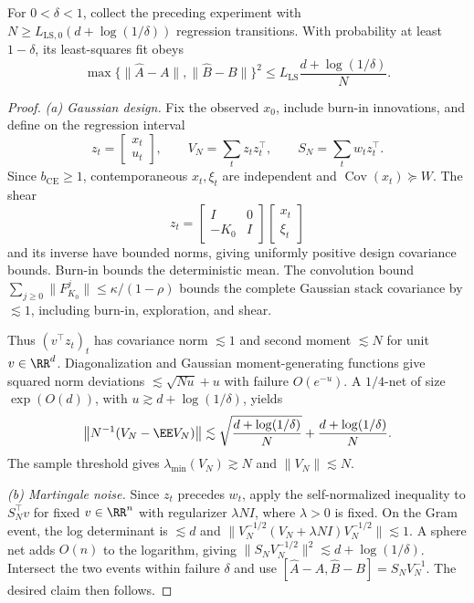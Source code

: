 \begin{lemma}\label{app:lem:ls}
For $0<\delta<1$, collect the preceding experiment with
$N\ge L_{\mathrm{LS},0}(d+\log(1/\delta))$ regression transitions.
With probability at least $1-\delta$, its least-squares fit obeys
\[
 \max\{\|\widehat A-A\|,\|\widehat B-B\|\}^2
 \le L_{\mathrm{LS}}\frac{d+\log(1/\delta)}N .
\]
\end{lemma}
\begin{proof}
\emph{(a) Gaussian design.}
Fix the observed $x_0$, include burn-in innovations, and define
on the regression interval
\[
 z_t=\begin{bmatrix}x_t\\u_t\end{bmatrix},\qquad
 V_N=\sum_tz_tz_t^\top,\qquad
 S_N=\sum_tw_tz_t^\top .
\]
Since $b_{\mathrm{CE}}\ge1$, contemporaneous $x_t,\xi_t$ are
independent and $\operatorname{Cov}(x_t)\succeq W$. The shear
\[
 z_t=\begin{bmatrix}I&0\\-K_0&I\end{bmatrix}
       \begin{bmatrix}x_t\\\xi_t\end{bmatrix}
\]
and its inverse have bounded norms, giving uniformly positive
design covariance bounds. Burn-in bounds the deterministic mean.
The convolution bound
$\sum_{j\ge0}\|F_{K_0}^j\|\le\kappa/(1-\rho)$ bounds the complete
Gaussian stack covariance by $\lesssim1$, including burn-in,
exploration, and shear.

Thus $(v^\top z_t)_t$ has covariance norm $\lesssim1$ and second
moment $\lesssim N$ for unit $v\in\RR^d$.
Diagonalization and Gaussian moment-generating functions give squared
norm deviations $\lesssim\sqrt{Nu}+u$ with failure $O(e^{-u})$.
A $1/4$-net of size $\exp(O(d))$, with
$u\gtrsim d+\log(1/\delta)$, yields
\[
 \left\|N^{-1}(V_N-\EE V_N)\right\|
 \lesssim\sqrt{\frac{d+\log(1/\delta)}N}
              +\frac{d+\log(1/\delta)}N .
\]
The sample threshold gives
$\lambda_{\min}(V_N)\gtrsim N$ and $\|V_N\|\lesssim N$.

\emph{(b) Martingale noise.}
Since $z_t$ precedes $w_t$, apply the self-normalized inequality
\citep{abbasi2011improved} to $S_N^\top v$ for fixed $v\in\RR^n$
with regularizer $\lambda NI$, where $\lambda>0$ is fixed.
On the Gram event, the log determinant is $\lesssim d$ and
$\|V_N^{-1/2}(V_N+\lambda NI)V_N^{-1/2}\|\lesssim1$.
A sphere net adds $O(n)$ to the logarithm, giving
$\|S_NV_N^{-1/2}\|^2\lesssim d+\log(1/\delta)$.
Intersect the two events within failure $\delta$ and use
$[\widehat A-A,\widehat B-B]=S_NV_N^{-1}$.
The desired claim then follows.
\end{proof}

